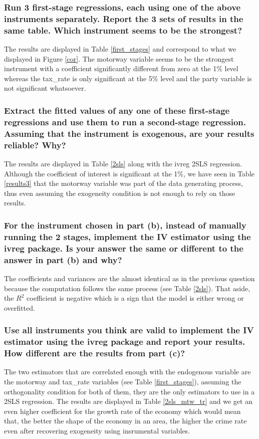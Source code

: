 
\subsubsection{Run 3 ﬁrst-stage regressions, each using one of the above instruments separately. Report
the 3 sets of results in the same table. Which instrument seems to be the strongest?}
The results are displayed in Table \ref{first_stages} and correspond to what we displayed in Figure \ref{cor}.
The motorway variable seems to be the strongest instrument with a coefficient significantly different from zero at the 1\% level whereas the tax\_rate is only significant at the 5\% level and the party variable is not significant whatsoever. 

\subsubsection{Extract the ﬁtted values of any one of these ﬁrst-stage regressions and use them to run
a second-stage regression. Assuming that the instrument is exogenous, are your results
reliable? Why?}
The results are displayed in Table \ref{2sls} along with the ivreg 2SLS regression. Although the coefficient of interest is significant at the 1\%, we have seen in Table \ref{results3} that the motorway variable
was part of the data generating process, thus even assuming the exogeneity condition is not enough to rely on those results.
\subsubsection{For the instrument chosen in part (b), instead of manually running the 2 stages, implement
the IV estimator using the ivreg package. Is your answer the same or different to the
answer in part (b) and why?}
The coefficients and variances are the almost identical as in the previous question because the computation follows the same process (see Table \ref{2sls}). That aside, the $R^2$ coefficient is negative which is a sign that the model is either wrong or overfitted. 

\subsubsection{Use all instruments you think are valid to implement the IV estimator using the ivreg
package and report your results. How different are the results from part (c)?}
The two estimators that are correlated enough with the endogenous variable are the motorway and tax\_rate variables
(see Table \ref{first_stages}), assuming the orthogonality condition for both of them, they are the only estimators to use in a 2SLS regression.
The results are displayed in Table \ref{2sls_mtw_tr} and we get an even higher coefficient for the growth rate of the economy which would mean that, the better the shape of the economy in an area, the higher the crime rate even after recovering exogeneity using insrumental variables. 
